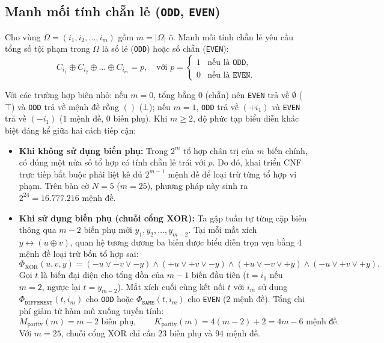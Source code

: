 \subsection{Manh mối tính chẵn lẻ (\texttt{ODD}, \texttt{EVEN})}
Cho vùng $\Omega = (i_1, i_2, \dots, i_m)$ gồm $m = |\Omega|$ ô. Manh mối tính chẵn lẻ yêu cầu tổng số tội phạm trong $\Omega$ là số lẻ (\texttt{ODD}) hoặc số chẵn (\texttt{EVEN}):
\begin{equation}
    C_{i_1} \oplus C_{i_2} \oplus \dots \oplus C_{i_m} = p, \quad \text{với } p = \begin{cases}
        1 & \text{nếu là } \texttt{ODD}, \\
        0 & \text{nếu là } \texttt{EVEN}.
    \end{cases}
\end{equation}

Với các trường hợp biên nhỏ: nếu $m = 0$, tổng bằng $0$ (chẵn) nên \texttt{EVEN} trả về $\emptyset$ ($\top$) và \texttt{ODD} trả về mệnh đề rỗng $()$ ($\bot$); nếu $m = 1$, \texttt{ODD} trả về $(+i_1)$ và \texttt{EVEN} trả về $(-i_1)$ ($1$ mệnh đề, $0$ biến phụ). Khi $m \ge 2$, độ phức tạp biểu diễn khác biệt đáng kể giữa hai cách tiếp cận:

\begin{itemize}
    \item \textbf{Khi không sử dụng biến phụ:} Trong $2^m$ tổ hợp chân trị của $m$ biến chính, có đúng một nửa số tổ hợp có tính chẵn lẻ trái với $p$. Do đó, khai triển CNF trực tiếp bắt buộc phải liệt kê đủ $2^{m-1}$ mệnh đề để loại trừ từng tổ hợp vi phạm. Trên bàn cờ $N = 5$ ($m = 25$), phương pháp này sinh ra $2^{24} = 16.777.216$ mệnh đề.

    \item \textbf{Khi sử dụng biến phụ (chuỗi cổng XOR):} Ta gập tuần tự từng cặp biến thông qua $m - 2$ biến phụ mới $y_1, y_2, \dots, y_{m-2}$. Tại mỗi mắt xích $y \leftrightarrow (u \oplus v)$, quan hệ tương đương ba biến được biểu diễn trọn vẹn bằng $4$ mệnh đề loại trừ bốn tổ hợp sai:
    \begin{equation}
        \Phi_{\text{XOR}}(u, v, y) = (-u \lor -v \lor -y) \land (+u \lor +v \lor -y) \land (+u \lor -v \lor +y) \land (-u \lor +v \lor +y).
    \end{equation}
    Gọi $t$ là biến đại diện cho tổng dồn của $m - 1$ biến đầu tiên ($t = i_1$ nếu $m = 2$, ngược lại $t = y_{m-2}$). Mắt xích cuối cùng kết nối $t$ với $i_m$ sử dụng $\Phi_{\texttt{DIFFERENT}}(t, i_m)$ cho \texttt{ODD} hoặc $\Phi_{\texttt{SAME}}(t, i_m)$ cho \texttt{EVEN} ($2$ mệnh đề). Tổng chi phí giảm từ hàm mũ xuống tuyến tính:
    \begin{equation}
        M_{\text{parity}}(m) = m - 2 \text{ biến phụ}, \qquad K_{\text{parity}}(m) = 4(m - 2) + 2 = 4m - 6 \text{ mệnh đề}.
    \end{equation}
    Với $m = 25$, chuỗi cổng XOR chỉ cần $23$ biến phụ và $94$ mệnh đề.
\end{itemize}
\newpage
